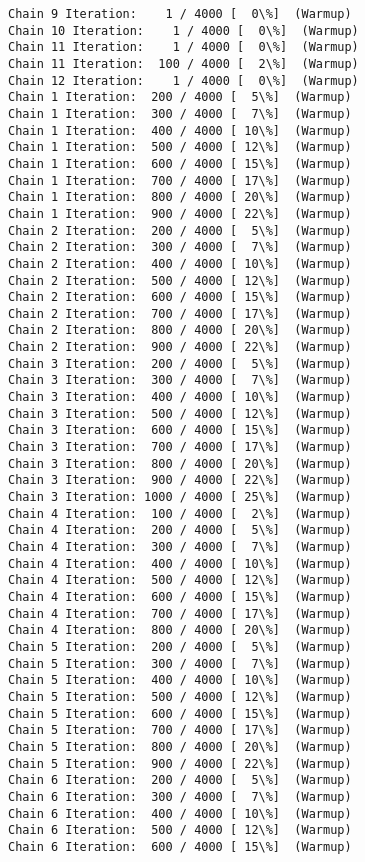 \documentclass[11pt]{article}
\begin{document}
    \begin{Verbatim}[commandchars=\\\{\}]
Chain 9 Iteration:    1 / 4000 [  0\%]  (Warmup)
Chain 10 Iteration:    1 / 4000 [  0\%]  (Warmup)
Chain 11 Iteration:    1 / 4000 [  0\%]  (Warmup)
Chain 11 Iteration:  100 / 4000 [  2\%]  (Warmup)
Chain 12 Iteration:    1 / 4000 [  0\%]  (Warmup)
Chain 1 Iteration:  200 / 4000 [  5\%]  (Warmup)
Chain 1 Iteration:  300 / 4000 [  7\%]  (Warmup)
Chain 1 Iteration:  400 / 4000 [ 10\%]  (Warmup)
Chain 1 Iteration:  500 / 4000 [ 12\%]  (Warmup)
Chain 1 Iteration:  600 / 4000 [ 15\%]  (Warmup)
Chain 1 Iteration:  700 / 4000 [ 17\%]  (Warmup)
Chain 1 Iteration:  800 / 4000 [ 20\%]  (Warmup)
Chain 1 Iteration:  900 / 4000 [ 22\%]  (Warmup)
Chain 2 Iteration:  200 / 4000 [  5\%]  (Warmup)
Chain 2 Iteration:  300 / 4000 [  7\%]  (Warmup)
Chain 2 Iteration:  400 / 4000 [ 10\%]  (Warmup)
Chain 2 Iteration:  500 / 4000 [ 12\%]  (Warmup)
Chain 2 Iteration:  600 / 4000 [ 15\%]  (Warmup)
Chain 2 Iteration:  700 / 4000 [ 17\%]  (Warmup)
Chain 2 Iteration:  800 / 4000 [ 20\%]  (Warmup)
Chain 2 Iteration:  900 / 4000 [ 22\%]  (Warmup)
Chain 3 Iteration:  200 / 4000 [  5\%]  (Warmup)
Chain 3 Iteration:  300 / 4000 [  7\%]  (Warmup)
Chain 3 Iteration:  400 / 4000 [ 10\%]  (Warmup)
Chain 3 Iteration:  500 / 4000 [ 12\%]  (Warmup)
Chain 3 Iteration:  600 / 4000 [ 15\%]  (Warmup)
Chain 3 Iteration:  700 / 4000 [ 17\%]  (Warmup)
Chain 3 Iteration:  800 / 4000 [ 20\%]  (Warmup)
Chain 3 Iteration:  900 / 4000 [ 22\%]  (Warmup)
Chain 3 Iteration: 1000 / 4000 [ 25\%]  (Warmup)
Chain 4 Iteration:  100 / 4000 [  2\%]  (Warmup)
Chain 4 Iteration:  200 / 4000 [  5\%]  (Warmup)
Chain 4 Iteration:  300 / 4000 [  7\%]  (Warmup)
Chain 4 Iteration:  400 / 4000 [ 10\%]  (Warmup)
Chain 4 Iteration:  500 / 4000 [ 12\%]  (Warmup)
Chain 4 Iteration:  600 / 4000 [ 15\%]  (Warmup)
Chain 4 Iteration:  700 / 4000 [ 17\%]  (Warmup)
Chain 4 Iteration:  800 / 4000 [ 20\%]  (Warmup)
Chain 5 Iteration:  200 / 4000 [  5\%]  (Warmup)
Chain 5 Iteration:  300 / 4000 [  7\%]  (Warmup)
Chain 5 Iteration:  400 / 4000 [ 10\%]  (Warmup)
Chain 5 Iteration:  500 / 4000 [ 12\%]  (Warmup)
Chain 5 Iteration:  600 / 4000 [ 15\%]  (Warmup)
Chain 5 Iteration:  700 / 4000 [ 17\%]  (Warmup)
Chain 5 Iteration:  800 / 4000 [ 20\%]  (Warmup)
Chain 5 Iteration:  900 / 4000 [ 22\%]  (Warmup)
Chain 6 Iteration:  200 / 4000 [  5\%]  (Warmup)
Chain 6 Iteration:  300 / 4000 [  7\%]  (Warmup)
Chain 6 Iteration:  400 / 4000 [ 10\%]  (Warmup)
Chain 6 Iteration:  500 / 4000 [ 12\%]  (Warmup)
Chain 6 Iteration:  600 / 4000 [ 15\%]  (Warmup)

\end{Verbatim}
\end{document}
